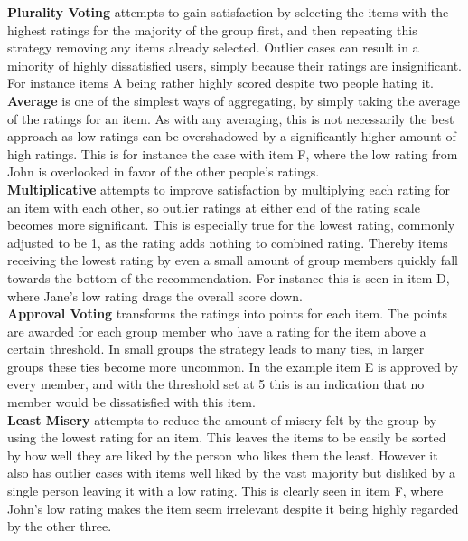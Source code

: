 \textbf{Plurality Voting} attempts to gain satisfaction by selecting the items with the highest ratings for the majority of the group first, and then repeating this strategy removing any items already selected. Outlier cases can result in a minority of highly dissatisfied users, simply because their ratings are insignificant. For instance items A being rather highly scored despite two people hating it.\\

\textbf{Average} is one of the simplest ways of aggregating, by simply taking the average of the ratings for an item. As with any averaging, this is not necessarily the best approach as low ratings can be overshadowed by a significantly higher amount of high ratings. This is for instance the case with item F, where the low rating from John is overlooked in favor of the other people's ratings.\\

\textbf{Multiplicative} attempts to improve satisfaction by multiplying each rating for an item with each other, so outlier ratings at either end of the rating scale becomes more significant. This is especially true for the lowest rating, commonly adjusted to be 1, as the rating adds nothing to combined rating. Thereby items receiving the lowest rating by even a small amount of group members quickly fall towards the bottom of the recommendation. For instance this is seen in item D, where Jane's low rating drags the overall score down.\\

\textbf{Approval Voting} transforms the ratings into points for each item. The points are awarded for each group member who have a rating for the item above a certain threshold. In small groups the strategy leads to many ties, in larger groups these ties become more uncommon. In the example item E is approved by every member, and with the threshold set at 5 this is an indication that no member would be dissatisfied with this item.\\

\textbf{Least Misery} attempts to reduce the amount of misery felt by the group by using the lowest rating for an item. This leaves the items to be easily be sorted by how well they are liked by the person who likes them the least. However it also has outlier cases with items well liked by the vast majority but disliked by a single person leaving it with a low rating. This is clearly seen in item F, where John's low rating makes the item seem irrelevant despite it being highly regarded by the other three.\\

